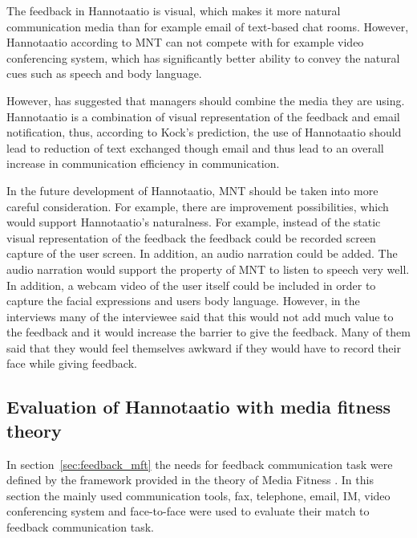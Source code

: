 \documentclass[english,12pt,a4paper,pdftex]{article}
\begin{document}
The feedback in Hannotaatio is visual, which makes it more natural communication media than for example email of text-based chat rooms. However, Hannotaatio according to \ac{MNT} can not compete with for example video conferencing system, which has significantly better ability to convey the natural cues such as speech and body language.

However, \citep{kock2007} has suggested that managers should combine the media they are using. Hannotaatio is a combination of visual representation of the feedback and email notification, thus, according to Kock's prediction, the use of Hannotaatio should lead to reduction of text exchanged though email and thus lead to an overall increase in communication efficiency in communication.

In the future development of Hannotaatio, \ac{MNT} should be taken into more careful consideration. For example, there are improvement possibilities, which would support Hannotaatio's naturalness. For example, instead of the static visual representation of the feedback the feedback could be recorded screen capture of the user screen. In addition, an audio narration could be added. The audio narration would support the property of \ac{MNT} to listen to speech very well. In addition, a webcam video of the user itself could be included in order to capture the facial expressions and users body language. However, in the interviews many of the interviewee said that this would not add much value to the feedback and it would increase the barrier to give the feedback. Many of them said that they would feel themselves awkward if they would have to record their face while giving feedback. 

\subsection{Evaluation of Hannotaatio with media fitness theory}
\label{sec:hannotaatio_mft}

In section~\ref{sec:feedback_mft} the needs for feedback communication task were defined by the framework provided in the theory of Media Fitness \citep{higa2007}. In this section the mainly used communication tools, fax, telephone, email, \ac{IM}, video conferencing system and face-to-face were used to evaluate their match to feedback communication task.
\end{document}
